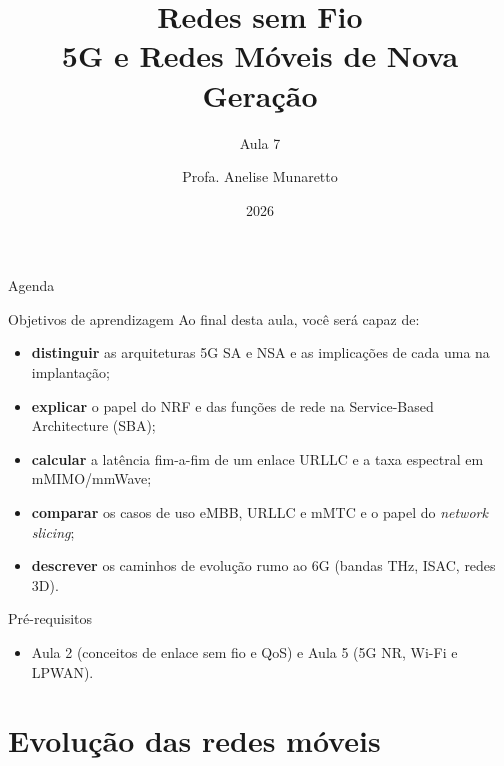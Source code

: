 \documentclass[aspectratio=169,11pt]{beamer}
\title[Redes sem Fio]{Redes sem Fio\\ 5G e Redes Móveis de Nova Geração}
\subtitle{Aula 7}
\author[Anelise Munaretto]{Profa. Anelise Munaretto}
\institute[Curso]{Redes sem Fio --- Ciência da Computação}
\date{2026}
\begin{document}
\begin{frame}[plain]
  \titlepage
\end{frame}

\begin{frame}{Agenda}
  \tableofcontents
\end{frame}

\begin{frame}{Objetivos de aprendizagem}
  Ao final desta aula, você será capaz de:
  \begin{itemize}
    \item \textbf{distinguir} as arquiteturas 5G SA e NSA e as implicações de cada uma na implantação;
    \item \textbf{explicar} o papel do NRF e das funções de rede na Service-Based Architecture (SBA);
    \item \textbf{calcular} a latência fim-a-fim de um enlace URLLC e a taxa espectral em mMIMO/mmWave;
    \item \textbf{comparar} os casos de uso eMBB, URLLC e mMTC e o papel do \emph{network slicing};
    \item \textbf{descrever} os caminhos de evolução rumo ao 6G (bandas THz, ISAC, redes 3D).
  \end{itemize}
  \begin{alertblock}{Pré-requisitos}
    \begin{itemize}
      \item Aula 2 (conceitos de enlace sem fio e QoS) e Aula 5 (5G NR, Wi-Fi e LPWAN).
    \end{itemize}
  \end{alertblock}
\end{frame}

\section{Evolução das redes móveis}
\end{document}
